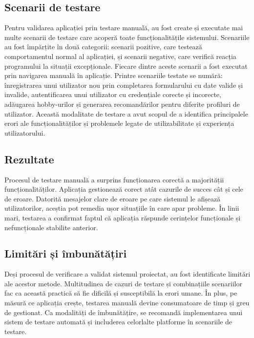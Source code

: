 \subsection{Scenarii de testare}
\label{subsec:ch4sec2sub2}
Pentru validarea aplicației prin testare manuală, au fost create și executate mai multe scenarii de testare care acoperă toate funcționalitățile sistemului.
Scenariile au fost împărțite în două categorii: scenarii pozitive, care testează comportamentul normal al aplicației, și scenarii negative, care verifică reacția programului la situații excepționale.
Fiecare dintre aceste scenarii a fost executat prin navigarea manuală în aplicație.
Printre scenariile testate se numără: înregistrarea unui utilizator nou prin completarea formularului cu date valide și invalide, autentificarea unui utilizator cu credențiale corecte și incorecte, adăugarea hobby-urilor și generarea recomandărilor pentru diferite profiluri de utilizator.
Această modalitate de testare a avut scopul de a identifica principalele erori ale funcționalităților și problemele legate de utilizabilitate și experiența utilizatorului.

\subsection{Rezultate}
\label{subsec:ch4sec2sub3}
Procesul de testare manuală a surprins funcționarea corectă a majorității funcționalităților.
Aplicația gestionează corect atât cazurile de succes cât și cele de eroare.
Datorită mesajelor clare de eroare pe care sistemul le afișează utilizatorilor, aceștia pot remedia ușor situațiile în care apar probleme.
În linii mari, testarea a confirmat faptul că aplicația răspunde cerințelor funcționale și nefuncționale stabilite anterior.

\subsection{Limitări și îmbunătățiri}
\label{subsec:ch4sec2sub4}
Deși procesul de verificare a validat sistemul proiectat, au fost identificate limitări ale acestor metode.
Multitudinea de cazuri de testare și combinațiile scenariilor fac ca această practică să fie dificilă și susceptibilă la erori umane.
În plus, pe măsură ce aplicația crește, testarea manuală devine consumatoare de timp și greu de gestionat.
Ca modalități de îmbunătățire, se recomandă implementarea unui sistem de testare automată și includerea celorlalte platforme în scenariile de testare.